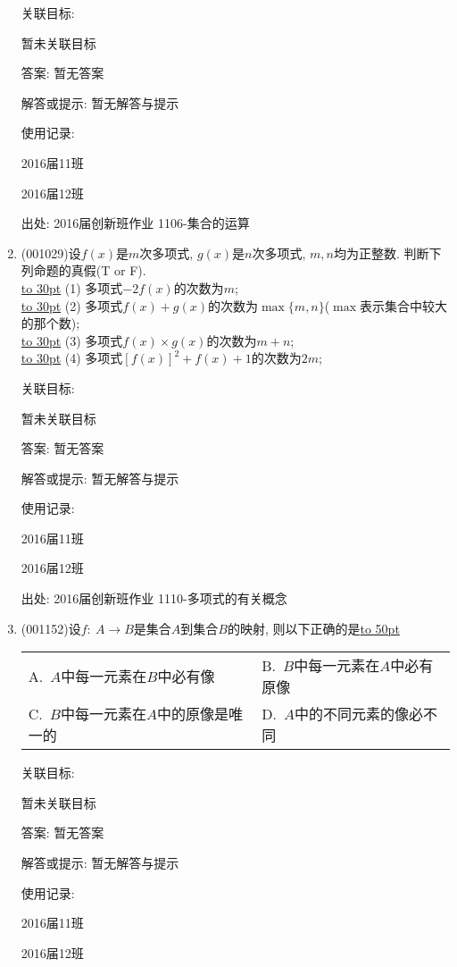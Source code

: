 \documentclass[10pt,a4paper]{article}
\newcommand{\blank}[1]{\underline{\hbox to #1pt{}}}
\newcommand{\twoch}[4]{\par\begin{tabular}{p{.46\textwidth}p{.46\textwidth}}
A.~#1& B.~#2\\
C.~#3& D.~#4
\end{tabular}}
\begin{document}
\begin{enumerate}[1.]
关联目标:

暂未关联目标

答案: 暂无答案

解答或提示: 暂无解答与提示

使用记录:

2016届11班	

2016届12班	


出处: 2016届创新班作业	1106-集合的运算
\item { (001029)}设$f(x)$是$m$次多项式, $g(x)$是$n$次多项式, $m,n$均为正整数. 判断下列命题的真假(T or F).\\ 
\blank{30} (1) 多项式$-2f(x)$的次数为$m$;\\ 
\blank{30} (2) 多项式$f(x)+g(x)$的次数为$\max\{m,n\}$($\max$表示集合中较大的那个数);\\ 
\blank{30} (3) 多项式$f(x)\times g(x)$的次数为$m+n$;\\ 
\blank{30} (4) 多项式$[f(x)]^2+f(x)+1$的次数为$2m$;


关联目标:

暂未关联目标

答案: 暂无答案

解答或提示: 暂无解答与提示

使用记录:

2016届11班				

2016届12班				


出处: 2016届创新班作业	1110-多项式的有关概念
\item { (001152)}设$f:\ A\rightarrow B$是集合$A$到集合$B$的映射, 则以下正确的是\blank{50}
\twoch{$A$中每一元素在$B$中必有像}{$B$中每一元素在$A$中必有原像}{$B$中每一元素在$A$中的原像是唯一的}{$A$中的不同元素的像必不同}


关联目标:

暂未关联目标

答案: 暂无答案

解答或提示: 暂无解答与提示

使用记录:

2016届11班	

2016届12班	



\end{enumerate}
\end{document}
